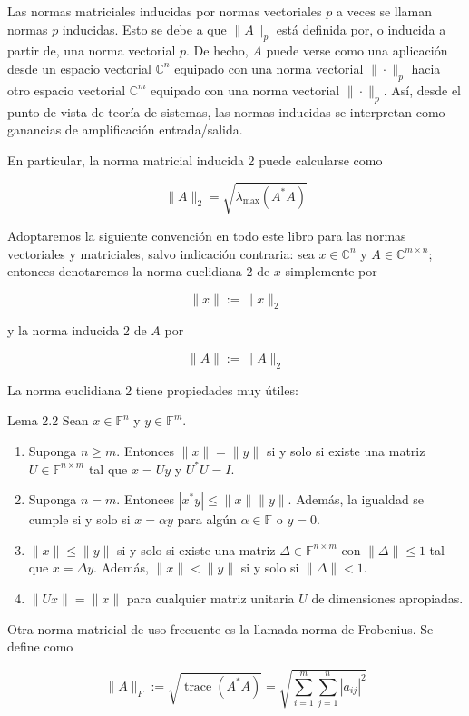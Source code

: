 \documentclass[11pt]{article}
\begin{document}
Las normas matriciales inducidas por normas vectoriales $p$ a veces se llaman normas $p$ inducidas. Esto se debe a que $\|A\|_{p}$ está definida por, o inducida a partir de, una norma vectorial $p$. De hecho, $A$ puede verse como una aplicación desde un espacio vectorial $\mathbb{C}^{n}$ equipado con una norma vectorial $\|\cdot\|_{p}$ hacia otro espacio vectorial $\mathbb{C}^{m}$ equipado con una norma vectorial $\|\cdot\|_{p}$. Así, desde el punto de vista de teoría de sistemas, las normas inducidas se interpretan como ganancias de amplificación entrada/salida.

En particular, la norma matricial inducida 2 puede calcularse como

$$
\|A\|_{2}=\sqrt{\lambda_{\max }\left(A^{*} A\right)}
$$

Adoptaremos la siguiente convención en todo este libro para las normas vectoriales y matriciales, salvo indicación contraria: sea $x \in \mathbb{C}^{n}$ y $A \in \mathbb{C}^{m \times n}$; entonces denotaremos la norma euclidiana 2 de $x$ simplemente por

$$
\|x\|:=\|x\|_{2}
$$

y la norma inducida 2 de $A$ por

$$
\|A\|:=\|A\|_{2}
$$

La norma euclidiana 2 tiene propiedades muy útiles:

Lema 2.2 Sean $x \in \mathbb{F}^{n}$ y $y \in \mathbb{F}^{m}$.

\begin{enumerate}
  \item Suponga $n \geq m$. Entonces $\|x\|=\|y\|$ si y solo si existe una matriz $U \in \mathbb{F}^{n \times m}$ tal que $x=U y$ y $U^{*} U=I$.
  \item Suponga $n=m$. Entonces $\left|x^{*} y\right| \leq\|x\|\|y\|$. Además, la igualdad se cumple si y solo si $x=\alpha y$ para algún $\alpha \in \mathbb{F}$ o $y=0$.
  \item $\|x\| \leq\|y\|$ si y solo si existe una matriz $\Delta \in \mathbb{F}^{n \times m}$ con $\|\Delta\| \leq 1$ tal que $x=\Delta y$. Además, $\|x\|<\|y\|$ si y solo si $\|\Delta\|<1$.
  \item $\|U x\|=\|x\|$ para cualquier matriz unitaria $U$ de dimensiones apropiadas.
\end{enumerate}

Otra norma matricial de uso frecuente es la llamada norma de Frobenius. Se define como

$$
\|A\|_{F}:=\sqrt{\operatorname{trace}\left(A^{*} A\right)}=\sqrt{\sum_{i=1}^{m} \sum_{j=1}^{n}\left|a_{i j}\right|^{2}}
$$
\end{document}
